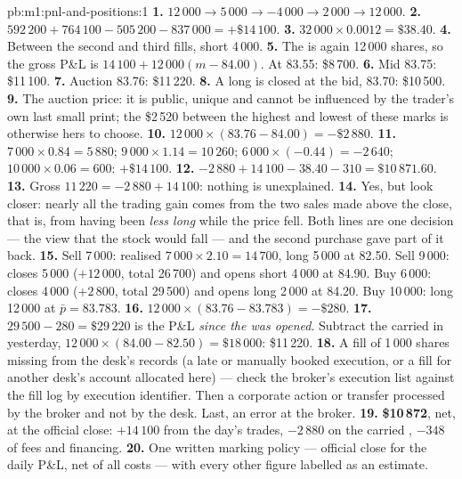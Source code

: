 \begin{solution}{pb:m1:pnl-and-positions:1}
\textbf{1.} $12\,000 \to 5\,000 \to -4\,000 \to 2\,000 \to 12\,000$.
\textbf{2.} $592\,200 + 764\,100 - 505\,200 - 837\,000 = +\$14\,100$.
\textbf{3.} $32\,000 \times 0.0012 = \$38.40$.
\textbf{4.} Between the second and third fills, short 4\,000.
\textbf{5.} The  is again 12\,000 shares, so the gross P\&L is
$14\,100 + 12\,000(m - 84.00)$. At 83.55: \$8\,700.
\textbf{6.} Mid 83.75: \$11\,100.
\textbf{7.} Auction 83.76: \$11\,220.
\textbf{8.} A long is closed at the bid, 83.70: \$10\,500.
\textbf{9.} The auction price: it is public, unique and cannot be influenced
by the trader's own last small print; the \$2\,520 between the highest and
lowest of these marks is otherwise hers to choose.
\textbf{10.} $12\,000\times(83.76-84.00) = -\$2\,880$.
\textbf{11.} $7\,000\times0.84 = 5\,880$; $9\,000\times1.14 = 10\,260$;
$6\,000\times(-0.44) = -2\,640$; $10\,000\times0.06 = 600$: $+\$14\,100$.
\textbf{12.} $-2\,880 + 14\,100 - 38.40 - 310 = \$10\,871.60$.
\textbf{13.} Gross $11\,220 = -2\,880 + 14\,100$: nothing is unexplained.
\textbf{14.} Yes, but look closer: nearly all the trading gain comes from
the two sales made above the close, that is, from having been \emph{less
long} while the price fell. Both lines are one decision --- the view that the
stock would fall --- and the second purchase gave part of it back.
\textbf{15.} Sell 7\,000: realised $7\,000\times2.10 = 14\,700$, long 5\,000 at
82.50. Sell 9\,000: closes 5\,000 ($+12\,000$, total 26\,700) and opens short
4\,000 at 84.90. Buy 6\,000: closes 4\,000 ($+2\,800$, total 29\,500) and opens
long 2\,000 at 84.20. Buy 10\,000: long 12\,000 at $\bar p = 83.783$.
\textbf{16.} $12\,000\times(83.76-83.783) = -\$280$.
\textbf{17.} $29\,500 - 280 = \$29\,220$ is the P\&L \emph{since the 
was opened}. Subtract the  carried in yesterday,
$12\,000\times(84.00-82.50) = \$18\,000$: \$11\,220.
\textbf{18.} A fill of 1\,000 shares missing from the desk's records (a
late or manually booked execution, or a fill for another desk's account
allocated here) --- check the broker's execution list against the fill log
by execution identifier. Then a corporate action or transfer processed by the
broker and not by the desk. Last, an error at the broker.
\textbf{19.} \textbf{\$10\,872}, net, at the official close: $+14\,100$ from
the day's trades, $-2\,880$ on the carried , $-348$ of fees and
financing.
\textbf{20.} One written marking policy --- official close for the daily
P\&L, net of all costs --- with every other figure labelled as an estimate.
\end{solution}


